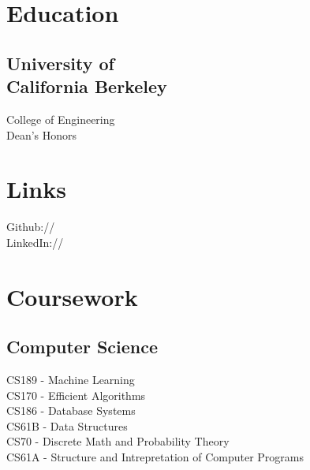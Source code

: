 \documentclass[]{format}
\begin{document}
%
%



%
%

\begin{minipage}[t]{0.33\textwidth} 


\section{Education} 
\subsection[University of California Berkeley]{\texorpdfstring{University of \\ California Berkeley}{University of California Berkeley}}
College of Engineering \\
Dean's Honors\\
\sectionsep


\section{Links} 
Github:// \href{https://github.com/SirjanK}{} \\
LinkedIn://  \href{https://www.linkedin.com/in/sirjankafle}{} \\
\sectionsep


\section{Coursework}
\subsection{Computer Science}
CS189 - Machine Learning \\
CS170 - Efficient Algorithms \\
CS186 - Database Systems \\
CS61B - Data Structures \\
CS70 - Discrete Math and Probability Theory \\
CS61A - Structure and Intrepretation of Computer Programs
\sectionsep


\end{minipage}
\end{document}
